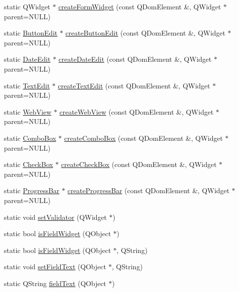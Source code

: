 \begin{DoxyCompactItemize}
\item 
static QWidget $\ast$ \hyperlink{classWidgetHelper_ae52d8d07fe63d8cc60ffd216aadafc52}{createFormWidget} (const QDomElement \&, QWidget $\ast$parent=NULL)
\item 
static \hyperlink{classButtonEdit}{ButtonEdit} $\ast$ \hyperlink{classWidgetHelper_ad97a163bd94704f52bd079d573da314b}{createButtonEdit} (const QDomElement \&, QWidget $\ast$parent=NULL)
\item 
static \hyperlink{classDateEdit}{DateEdit} $\ast$ \hyperlink{classWidgetHelper_a6354c56559916f916adebcf6b8f627d1}{createDateEdit} (const QDomElement \&, QWidget $\ast$parent=NULL)
\item 
static \hyperlink{classTextEdit}{TextEdit} $\ast$ \hyperlink{classWidgetHelper_a937976f257925ced21d24388e56c94a6}{createTextEdit} (const QDomElement \&, QWidget $\ast$parent=NULL)
\item 
static \hyperlink{classWebView}{WebView} $\ast$ \hyperlink{classWidgetHelper_a48d30e83e4a30db1d74d17d9b62022ce}{createWebView} (const QDomElement \&, QWidget $\ast$parent=NULL)
\item 
static \hyperlink{classComboBox}{ComboBox} $\ast$ \hyperlink{classWidgetHelper_a50bc6b6b14895efd71704e4d5a781331}{createComboBox} (const QDomElement \&, QWidget $\ast$parent=NULL)
\item 
static \hyperlink{classCheckBox}{CheckBox} $\ast$ \hyperlink{classWidgetHelper_a037063613f5af349e65e1bf6b788b0ad}{createCheckBox} (const QDomElement \&, QWidget $\ast$parent=NULL)
\item 
static \hyperlink{classProgressBar}{ProgressBar} $\ast$ \hyperlink{classWidgetHelper_a1e8b20777e928d477f77e118126ed9ad}{createProgressBar} (const QDomElement \&, QWidget $\ast$parent=NULL)
\item 
static void \hyperlink{classWidgetHelper_a53ad6696037211fd3ef0cbe545350d91}{setValidator} (QWidget $\ast$)
\item 
static bool \hyperlink{classWidgetHelper_a59309147e5fa4a38a4cf146279406220}{isFieldWidget} (QObject $\ast$)
\item 
static bool \hyperlink{classWidgetHelper_a35b32f711ca59921d88b31038c71aeae}{isFieldWidget} (QObject $\ast$, QString)
\item 
static void \hyperlink{classWidgetHelper_a2b32de266bc3de938fbcbad3e4e2d7b0}{setFieldText} (QObject $\ast$, QString)
\item 
static QString \hyperlink{classWidgetHelper_a3b07ca2c147e99a5856980f6ffdb414b}{fieldText} (QObject $\ast$)
\item 

\end{DoxyCompactItemize}
